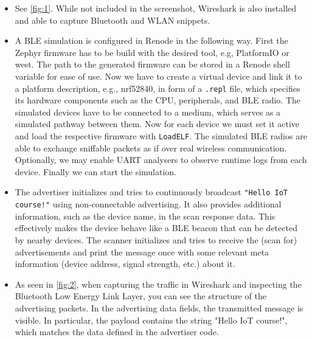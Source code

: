 \setcounter{exercise}{3}

\begin{exercise} \hfill
    \begin{itemize}
        \item[Q5] See \autoref{fig:1}.
            While not included in the screenshot, Wireshark is also installed and able to capture Bluetooth and WLAN snippets.
    \end{itemize}
\end{exercise}

\begin{exercise} \hfill
    \begin{itemize}
        \item[Q6] A BLE simulation is configured in Renode in the following way.
            First the Zephyr firmware has to be build with the desired tool, e.g, PlatformIO or west.
            The path to the generated firmware can be stored in a Renode shell variable for ease of use.
            Now we have to create a virtual device and link it to a platform description, e.g., nrf52840, in form of a \lstinline|.repl| file, which specifies its hardware components such as the CPU, peripherals, and BLE radio.
            The simulated devices have to be connected to a medium, which serves as a simulated pathway between them.
            Now for each device we must set it active and load the respective firmware with \lstinline|LoadELF|.
            The simulated BLE radios are able to exchange sniffable packets as if over real wireless communication.
            Optionally, we may enable UART analysers to observe runtime logs from each device.
            Finally we can start the simulation.

        \item[Q7] The advertiser initializes and tries to continuously broadcast \lstinline|"Hello IoT course!"| using non-connectable advertising.
            It also provides additional information, such as the device name, in the scan response data. This effectively makes the device behave like a BLE beacon that can be detected by nearby devices.
            The scanner initializes and tries to receive the (scan for) advertisements and print the message once with some relevant meta information (device address, signal strength, etc.) about it.

        \item[Q8] As seen in \autoref{fig:2}, when capturing the traffic in Wireshark and inspecting the Bluetooth Low Energy Link Layer, you can see the structure of the advertising packets.
            In the advertising data fields, the transmitted message is visible. In particular, the payload contains the string "Hello IoT course!", which matches the data defined in the advertiser code.
    \end{itemize}
\end{exercise}


